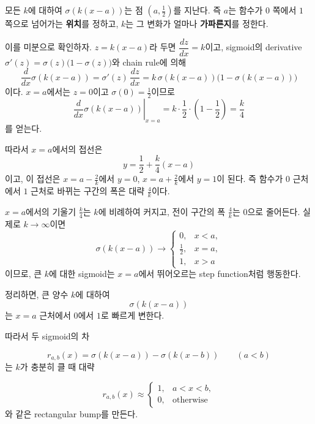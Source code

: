 \documentclass[11pt,a4paper]{article}
\newcommand{\sigmoid}{\sigma}
\begin{document}
모든 $k$에 대하여 $\sigmoid(k(x-a))$는 점 $\left(a,\tfrac12\right)$를 지난다.
즉 $a$는 함수가 $0$ 쪽에서 $1$ 쪽으로 넘어가는 \textbf{위치}를 정하고,
$k$는 그 변화가 얼마나 \textbf{가파른지}를 정한다.

이를 미분으로 확인하자.
$z=k(x-a)$라 두면 $\dfrac{dz}{dx}=k$이고,
sigmoid의 derivative $\sigmoid'(z)=\sigmoid(z)\bigl(1-\sigmoid(z)\bigr)$와 chain rule에 의해
\[
\frac{d}{dx}\sigmoid(k(x-a))
=
\sigmoid'(z)\,\frac{dz}{dx}
=
k\,\sigmoid(k(x-a))\bigl(1-\sigmoid(k(x-a))\bigr)
\]
이다.
$x=a$에서는 $z=0$이고 $\sigmoid(0)=\tfrac12$이므로
\[
\boxed{
\left.\frac{d}{dx}\sigmoid(k(x-a))\right|_{x=a}
=
k\cdot\frac12\cdot\left(1-\frac12\right)
=
\frac{k}{4}
}
\]
를 얻는다.

따라서 $x=a$에서의 접선은
\[
y=\frac12+\frac{k}{4}(x-a)
\]
이고, 이 접선은 $x=a-\tfrac{2}{k}$에서 $y=0$, $x=a+\tfrac{2}{k}$에서 $y=1$이 된다.
즉 함수가 $0$ 근처에서 $1$ 근처로 바뀌는 구간의 폭은 대략 $\tfrac{4}{k}$이다.

\begin{keybox}
$x=a$에서의 기울기 $\tfrac{k}{4}$는 $k$에 비례하여 커지고,
전이 구간의 폭 $\tfrac{4}{k}$는 $0$으로 줄어든다.
실제로 $k\to\infty$이면
\[
\sigmoid(k(x-a))
\longrightarrow
\begin{cases}
0,& x<a,\\[2pt]
\tfrac12,& x=a,\\[2pt]
1,& x>a
\end{cases}
\]
이므로, 큰 $k$에 대한 sigmoid는 $x=a$에서 뛰어오르는 step function처럼 행동한다.
\end{keybox}

정리하면, 큰 양수 $k$에 대하여
\[
\sigmoid(k(x-a))
\]
는 $x=a$ 근처에서 $0$에서 $1$로 빠르게 변한다.

따라서 두 sigmoid의 차

\[
\boxed{
r_{a,b}(x)
=
\sigmoid(k(x-a))
-
\sigmoid(k(x-b))
}
\qquad (a<b)
\]
는 $k$가 충분히 클 때 대략

\[
r_{a,b}(x)
\approx
\begin{cases}
1,&a<x<b,\\
0,&\text{otherwise}
\end{cases}
\]
와 같은 rectangular bump를 만든다.
\end{document}
